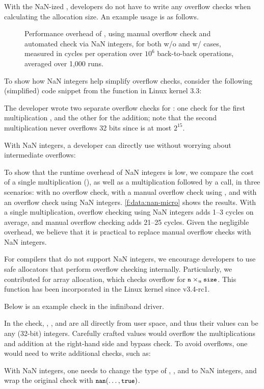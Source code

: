 With the NaN-ized , developers do not have to write any overflow checks
when calculating the allocation size.
An example usage is as follows.


\begin{figure}
\centering

\caption{Performance overhead of ,
using manual overflow check  and
automated check via NaN integers, for both w/o and w/ 
cases, measured in cycles per operation over $10^6$ back-to-back
operations, averaged over 1,000 runs.}
\label{f:data:nan-micro}
\end{figure}

To show how NaN integers help simplify overflow checks,
consider the following (simplified) code snippet from the
 function in Linux kernel 3.3:
%

%
The developer wrote two separate overflow checks for
:
one check for the first multiplication , and
the other for the addition;
note that the second multiplication 
never overflows 32 bits since  is at most $2^{15}$.

With NaN integers, a developer can directly use 
without worrying about intermediate overflows:


To show that the runtime overhead of NaN integers is low, we compare
the cost of a single multiplication (), as well as a multiplication
followed by a  call, in three scenarios: with no overflow
check, with a manual overflow check using
, and with an overflow check using
NaN integers.
%
\autoref{f:data:nan-micro} shows the results.
%
With a single multiplication, overflow checking using NaN integers
adds 1--3 cycles on average, and manual overflow checking adds
21--25 cycles.
%
Given the negligible overhead, we believe that it is practical
to replace manual overflow checks with NaN integers.

For compilers that do not support NaN integers, we encourage
developers to use safe allocators that perform overflow checking
internally.  Particularly, we contributed  for array allocation, which checks overflow for $\cc{n}
\times_u \cc{size}$. This function has been incorporated in the Linux kernel
since v3.4-rc1.

Below is an example check in the infiniband driver.

In the check, , , and  are
all directly from user space, and thus their values can be any
(32-bit) integers.  Carefully crafted values would overflow the
multiplications and addition at the right-hand side and bypass
check.  To avoid overflows, one would need to write additional
checks, such as:

With NaN integers, one needs to change the type of
, , and  to NaN integers,
and wrap the original check with $\cc{nan}(\dots, \cc{true})$.

\fi

